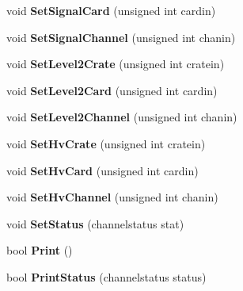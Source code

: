 \begin{DoxyCompactItemize}
\item 
\hypertarget{classChannel_aaa842caa030e691f361bbb38b60c19ac}{
void {\bfseries SetSignalCard} (unsigned int cardin)}
\label{classChannel_aaa842caa030e691f361bbb38b60c19ac}

\item 
\hypertarget{classChannel_acd431f017fca170ea3036f96b0f79e9f}{
void {\bfseries SetSignalChannel} (unsigned int chanin)}
\label{classChannel_acd431f017fca170ea3036f96b0f79e9f}

\item 
\hypertarget{classChannel_a82c97b5b03f81dc4c415f9e6ff4e5cd7}{
void {\bfseries SetLevel2Crate} (unsigned int cratein)}
\label{classChannel_a82c97b5b03f81dc4c415f9e6ff4e5cd7}

\item 
\hypertarget{classChannel_a7144068a386f201f596bb389a09c2806}{
void {\bfseries SetLevel2Card} (unsigned int cardin)}
\label{classChannel_a7144068a386f201f596bb389a09c2806}

\item 
\hypertarget{classChannel_ab6fbf3a0ad9f0a81f57e78b4d0030b1b}{
void {\bfseries SetLevel2Channel} (unsigned int chanin)}
\label{classChannel_ab6fbf3a0ad9f0a81f57e78b4d0030b1b}

\item 
\hypertarget{classChannel_a0fa53863af75dc3113462587216eb72f}{
void {\bfseries SetHvCrate} (unsigned int cratein)}
\label{classChannel_a0fa53863af75dc3113462587216eb72f}

\item 
\hypertarget{classChannel_a6d80a27a7baf8c35f107794f3907cd8f}{
void {\bfseries SetHvCard} (unsigned int cardin)}
\label{classChannel_a6d80a27a7baf8c35f107794f3907cd8f}

\item 
\hypertarget{classChannel_ab710af8a4a2334b2fecb7908ef14f18b}{
void {\bfseries SetHvChannel} (unsigned int chanin)}
\label{classChannel_ab710af8a4a2334b2fecb7908ef14f18b}

\item 
\hypertarget{classChannel_af036686e0a7cecce9996e28cf7f2067f}{
void {\bfseries SetStatus} (channelstatus stat)}
\label{classChannel_af036686e0a7cecce9996e28cf7f2067f}

\item 
\hypertarget{classChannel_a8361bdcaf6dfafc874f6a612dcded25a}{
bool {\bfseries Print} ()}
\label{classChannel_a8361bdcaf6dfafc874f6a612dcded25a}

\item 
\hypertarget{classChannel_ad5ceba06c660386cafaf7801f6adbfad}{
bool {\bfseries PrintStatus} (channelstatus status)}
\label{classChannel_ad5ceba06c660386cafaf7801f6adbfad}

\end{DoxyCompactItemize}
